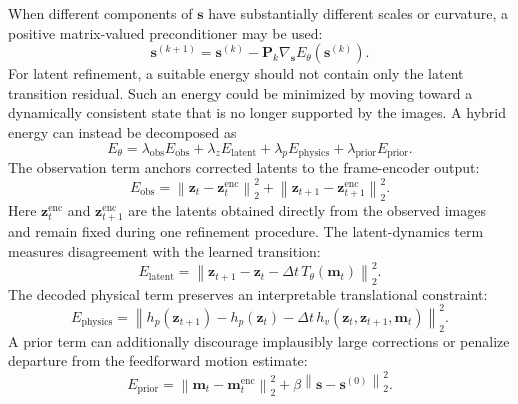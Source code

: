 \documentclass[11pt,a4paper]{article}
\begin{document}
When different components of $\mathbf s$ have substantially different scales or curvature, a positive matrix-valued preconditioner may be used: 
\begin{equation} 
	\mathbf s^{(k+1)} = \mathbf s^{(k)} - \mathbf P_k \nabla_{\mathbf s} E_\theta(\mathbf s^{(k)}). \label{eq:preconditioned-refinement} 
\end{equation} For latent refinement, a suitable energy should not contain only the latent transition residual. Such an energy could be minimized by moving toward a dynamically consistent state that is no longer supported by the images. A hybrid energy can instead be decomposed as 
\begin{equation} 
	E_\theta = \lambda_{\mathrm{obs}}E_{\mathrm{obs}} + \lambda_zE_{\mathrm{latent}} + \lambda_pE_{\mathrm{physics}} + \lambda_{\mathrm{prior}}E_{\mathrm{prior}}. \label{eq:hybrid-energy} 
\end{equation} 
The observation term anchors corrected latents to the frame-encoder output: 
\begin{equation} 
	E_{\mathrm{obs}} = \left\| \mathbf z_t-\mathbf z_t^{\mathrm{enc}} \right\|_2^2 + \left\| \mathbf z_{t+1}-\mathbf z_{t+1}^{\mathrm{enc}} \right\|_2^2. \label{eq:observation-energy} 
\end{equation} 
Here $\mathbf z_t^{\mathrm{enc}}$ and $\mathbf z_{t+1}^{\mathrm{enc}}$ are the latents obtained directly from the observed images and remain fixed during one refinement procedure. 
The latent-dynamics term measures disagreement with the learned transition: 
\begin{equation} 
	E_{\mathrm{latent}} = \left\| \mathbf z_{t+1} - \mathbf z_t - \Delta t\, T_\theta(\mathbf m_t) \right\|_2^2. \label{eq:latent-energy} 
\end{equation} 
The decoded physical term preserves an interpretable translational constraint: 
\begin{equation} 
	E_{\mathrm{physics}} = \left\| h_p(\mathbf z_{t+1}) - h_p(\mathbf z_t) - \Delta t\, h_v( \mathbf z_t, \mathbf z_{t+1}, \mathbf m_t ) \right\|_2^2. \label{eq:decoded-physics-energy} 
\end{equation} 
A prior term can additionally discourage implausibly large corrections or penalize departure from the feedforward motion estimate: 
\begin{equation} 
	E_{\mathrm{prior}} = \left\| \mathbf m_t-\mathbf m_t^{\mathrm{enc}} \right\|_2^2 + \beta \left\| \mathbf s-\mathbf s^{(0)} \right\|_2^2. \label{eq:prior-energy} 
\end{equation} 
\end{document}

